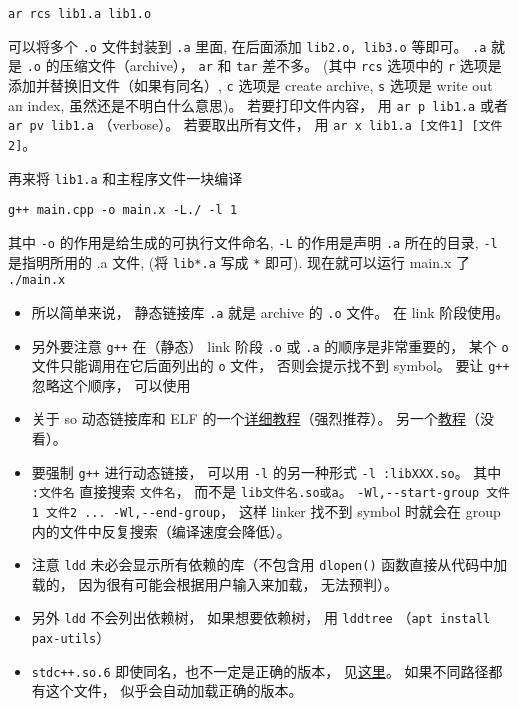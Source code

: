 \begin{lstlisting}[language=none]
ar rcs lib1.a lib1.o
\end{lstlisting}
可以将多个 \verb|.o| 文件封装到 \verb|.a| 里面, 在后面添加 \verb|lib2.o, lib3.o| 等即可。 \verb`.a` 就是 \verb`.o` 的压缩文件（archive）， \verb`ar` 和 \verb`tar` 差不多。 (其中 \verb|rcs| 选项中的 \verb`r` 选项是添加并替换旧文件（如果有同名）, \verb`c` 选项是 create archive, \verb`s` 选项是 write out an index, 虽然还是不明白什么意思)。 若要打印文件内容， 用 \verb|ar p lib1.a| 或者 \verb|ar pv lib1.a| （verbose）。 若要取出所有文件， 用 \verb|ar x lib1.a [文件1] [文件2]|。

再来将 \verb|lib1.a| 和主程序文件一块编译
\begin{lstlisting}[language=none]
g++ main.cpp -o main.x -L./ -l 1
\end{lstlisting}

其中 \verb`-o` 的作用是给生成的可执行文件命名, \verb`-L` 的作用是声明 \verb`.a` 所在的目录, \verb`-l` 是指明所用的 .a 文件, (将 \verb`lib*.a` 写成 \verb`*` 即可).
现在就可以运行 main.x 了
\verb`./main.x`

\begin{itemize}
\item 所以简单来说， 静态链接库 \verb`.a` 就是 archive 的 \verb`.o` 文件。 在 link 阶段使用。
\item 另外要注意 \verb`g++` 在（静态） link 阶段 \verb`.o` 或 \verb`.a` 的顺序是非常重要的， 某个 \verb`o` 文件只能调用在它后面列出的 \verb`o` 文件， 否则会提示找不到 symbol。 要让 \verb`g++` 忽略这个顺序， 可以使用
\item 关于 so 动态链接库和 ELF 的一个\href{https://amir.rachum.com/blog/2016/09/17/shared-libraries/}{详细教程}（强烈推荐）。 另一个\href{https://holtstrom.com/michael/blog/post/446/Shared-Library-Symbol-Conflicts-(on-Solaris).html}{教程}（没看）。
\item 要强制 \verb|g++| 进行动态链接， 可以用 \verb|-l| 的另一种形式 \verb|-l :libXXX.so|。 其中 \verb|:文件名| 直接搜索 \verb|文件名|， 而不是 \verb|lib文件名.so或a|。
\verb`-Wl,--start-group 文件1 文件2 ... -Wl,--end-group`， 这样 linker 找不到 symbol 时就会在 group 内的文件中反复搜索（编译速度会降低）。
\item 注意 \verb|ldd| 未必会显示所有依赖的库（不包含用 \verb|dlopen()| 函数直接从代码中加载的， 因为很有可能会根据用户输入来加载， 无法预判）。
\item 另外 \verb|ldd| 不会列出依赖树， 如果想要依赖树， 用 \verb|lddtree| （\verb|apt install pax-utils|）
\item \verb|stdc++.so.6| 即使同名，也不一定是正确的版本， 见\href{https://unix.stackexchange.com/questions/458659/what-do-the-multiple-glibc-versions-mean-in-the-output-of-ldd}{这里}。 如果不同路径都有这个文件， 似乎会自动加载正确的版本。
\end{itemize}

